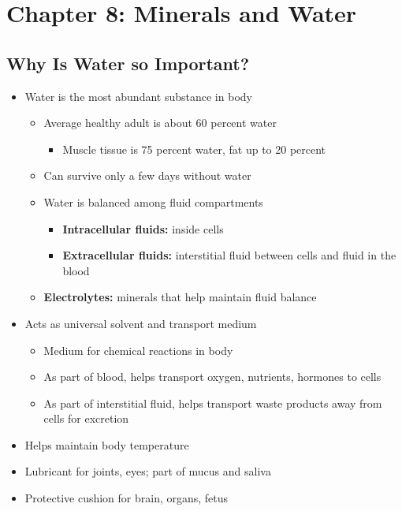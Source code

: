 \documentclass[12pt]{article}
\begin{document}
    \section{Chapter 8: Minerals and Water}
            
        \subsection{Why Is Water so Important?}
            \begin{itemize}
                \item Water is the most abundant substance in body
                    \begin{itemize}
                        \item Average healthy adult is about 60 percent water
                            \begin{itemize}
                                \item Muscle tissue is 75 percent water, fat up to 20 percent
                            \end{itemize}
                        \item Can survive only a few days without water
                        \item Water is balanced among fluid compartments
                            \begin{itemize}
                                \item \textbf{Intracellular fluids:} inside cells
                                \item \textbf{Extracellular fluids:} interstitial fluid between cells and fluid in the blood
                            \end{itemize}
                        \item \textbf{Electrolytes:} minerals that help maintain fluid balance
                    \end{itemize}
                \item Acts as universal solvent and transport medium
                    \begin{itemize}
                        \item Medium for chemical reactions in body
                        \item As part of blood, helps transport oxygen, nutrients, hormones to cells
                        \item As part of interstitial fluid, helps transport waste products away from cells for excretion
                    \end{itemize}
                \item Helps maintain body temperature
                \item Lubricant for joints, eyes; part of mucus and saliva
                \item Protective cushion for brain, organs, fetus
            \end{itemize}
\end{document}

